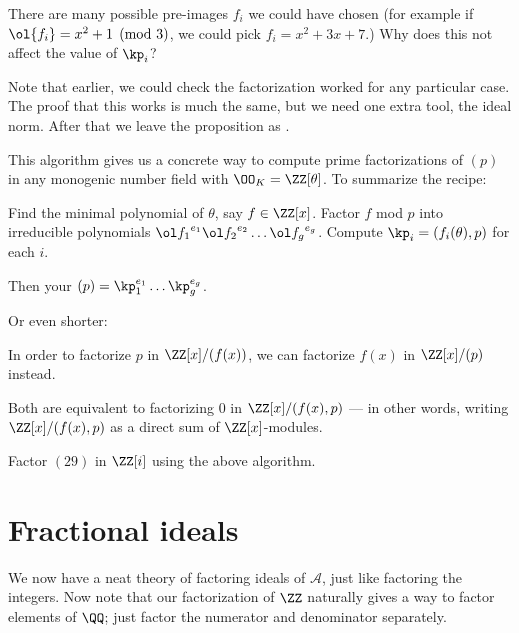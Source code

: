 \begin{ques}
	There are many possible pre-images $f_i$ we could have chosen
	(for example if $\ol{f_i} = x^2+1 \pmod 3$, we could pick $f_i = x^2 + 3x + 7$.)
	Why does this not affect the value of $\kp_i$?
\end{ques}

Note that earlier, we could check the factorization worked
for any particular case.
The proof that this works is much the same, but we need one extra tool, the ideal norm.
After that we leave the proposition as .

This algorithm gives us a concrete way to compute prime factorizations of $(p)$
in any monogenic number field with $\OO_K = \ZZ[\theta]$. To summarize the recipe:
\begin{enumerate}
	\ii Find the minimal polynomial of $\theta$, say $f \in \ZZ[x]$.
	\ii Factor $f$ mod $p$ into irreducible polynomials
	${\ol f_1}^{e_1} {\ol f_2}^{e_2} \dots {\ol f_g}^{e_g}$.
	\ii Compute $\kp_i = (f_i(\theta), p)$ for each $i$.
\end{enumerate}
Then your $(p) = \kp_1^{e_1} \dots \kp_g^{e_g}$.

Or even shorter:
\begin{moral}
	In order to factorize $p$ in $\ZZ[x]/(f(x))$, we can factorize $f(x)$ in $\ZZ[x]/(p)$ instead.
\end{moral}
Both are equivalent to factorizing $0$ in $\ZZ[x]/(f(x), p)$ --- in other words, writing
$\ZZ[x]/(f(x), p)$ as a direct sum of $\ZZ[x]$-modules.

\begin{exercise}
	Factor $(29)$ in $\ZZ[i]$ using the above algorithm.
\end{exercise}


\section{Fractional ideals}
We now have a neat theory of factoring ideals of $\mathcal A$,
just like factoring the integers.
Now note that our factorization of $\ZZ$ naturally gives a way to factor
elements of $\QQ$; just factor the numerator and denominator separately.

